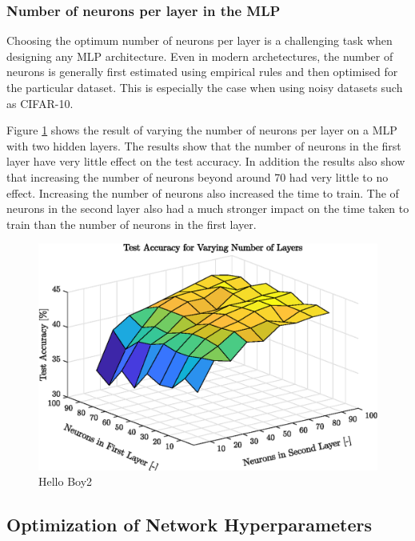 \subsubsection{Number of neurons per layer in the MLP}

Choosing the optimum number of neurons per layer is a challenging task when designing any MLP architecture. Even in modern archetectures, the number of neurons is generally first estimated using empirical rules and then optimised for the particular dataset\cite{lawrence1998size}. This is especially the case when using noisy datasets such as CIFAR-10.

Figure \ref{fig:surfaceLayers} shows the result of varying the number of neurons per layer on a MLP with two hidden layers. The results show that the number of neurons in the first layer have very little effect on the test accuracy. In addition the results also show that increasing the number of neurons beyond around 70 had very little to no effect. Increasing the number of neurons also increased the time to train. The of neurons in the second layer also had a much stronger impact on the time taken to train than the number of neurons in the first layer.

	\begin{figure}[h!]
   		 \centering
   		 \includegraphics{images/surfacelayers}
   		 \caption{Hello Boy2}
   		 \label{fig:surfaceLayers}
    \end{figure}

\FloatBarrier

\subsection{Optimization of Network Hyperparameters}\label{subsec:optNet}

